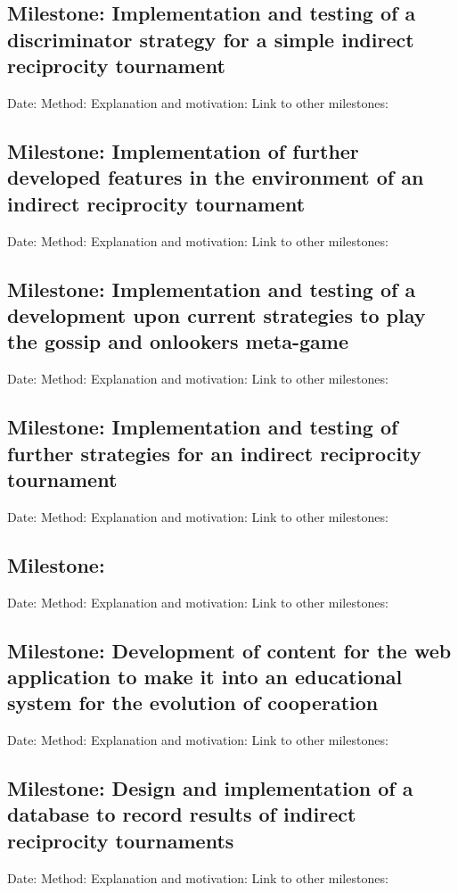 \documentclass{article}
\begin{document}
\subsection*{Milestone: Implementation and testing of a discriminator strategy for a simple indirect reciprocity tournament}
Date:
Method: 
Explanation and motivation:
Link to other milestones:

\subsection*{Milestone: Implementation of further developed features in the environment of an indirect reciprocity tournament}
Date:
Method: 
Explanation and motivation:
Link to other milestones:

\subsection*{Milestone: Implementation and testing of a development upon current strategies to play the gossip and onlookers meta-game}
Date:
Method: 
Explanation and motivation:
Link to other milestones:

\subsection*{Milestone: Implementation and testing of further strategies for an indirect reciprocity tournament}
Date:
Method: 
Explanation and motivation:
Link to other milestones:

\subsection*{Milestone: }
Date:
Method: 
Explanation and motivation:
Link to other milestones:

\subsection*{Milestone: Development of content for the web application to make it into an educational system for the evolution of cooperation}
Date:
Method: 
Explanation and motivation:
Link to other milestones:

\subsection*{Milestone: Design and implementation of a database to record results of indirect reciprocity tournaments}
Date:
Method: 
Explanation and motivation:
Link to other milestones:
\end{document}
